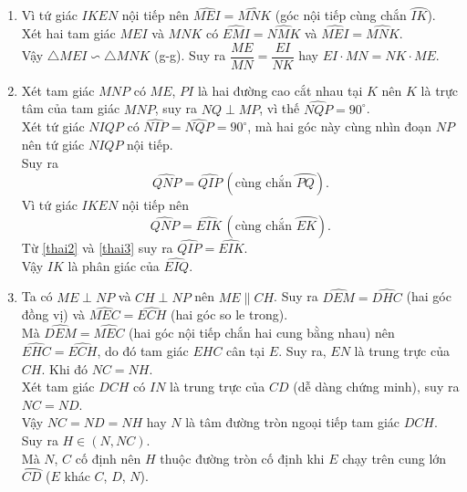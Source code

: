 \begin{ex}
{\begin{enumerate}
   Vì $E \in (O)$ nên $\widehat{NEM}=90^\circ$ (góc nội tiếp chắn nửa đường tròn). Suy ra $\widehat{NEK}=90^\circ$.\\
   Xét tứ giác $IKEN$ có $\widehat{NIK} + \widehat{NEK} = 180^\circ$, mà hai góc này ở vị trí đối diện nhau, cho nên tứ giác $IKEN$ nội tiếp.
   \item Vì tứ giác $IKEN$ nội tiếp nên $\widehat{MEI}=\widehat{MNK}$ (góc nội tiếp cùng chắn $\wideparen{IK}$).\\
   Xét hai tam giác $MEI$ và $MNK$ có $\widehat{EMI}=\widehat{NMK}$ và $\widehat{MEI}=\widehat{MNK}$.\\
   Vậy $\triangle MEI \backsim \triangle MNK$ (g-g). Suy ra $\dfrac{ME}{MN} = \dfrac{EI}{NK}$ hay $EI \cdot MN = NK \cdot ME$.
   \item Xét tam giác $MNP$ có $ME$, $PI$ là hai đường cao cắt nhau tại $K$ nên $K$ là trực tâm của tam giác $MNP$, suy ra $NQ \perp MP$, vì thế $\widehat{NQP}=90^\circ$.\\
   Xét tứ giác $NIQP$ có $\widehat{NIP}=\widehat{NQP}=90^\circ$, mà hai góc này cùng nhìn đoạn $NP$ nên tứ giác $NIQP$ nội tiếp.\\
   Suy ra
   \begin{equation}
    \widehat{QNP}=\widehat{QIP} \, (\text{cùng chắn } \wideparen{PQ}). \label{thai2}
   \end{equation}
   Vì tứ giác $IKEN$ nội tiếp nên
   \begin{equation}
    \widehat{QNP}=\widehat{EIK} \, (\text{cùng chắn } \wideparen{EK}). \label{thai3}
   \end{equation}
   Từ \eqref{thai2} và \eqref{thai3} suy ra $\widehat{QIP}=\widehat{EIK}$.\\
   Vậy $IK$ là phân giác của $\widehat{EIQ}$.
   \item Ta có $ME \perp NP$ và $CH \perp NP$ nên $ME \parallel CH$. Suy ra $\widehat{DEM}=\widehat{DHC}$ (hai góc đồng vị) và $\widehat{MEC}=\widehat{ECH}$ (hai góc so le trong).\\
   Mà $\widehat{DEM}=\widehat{MEC}$ (hai góc nội tiếp chắn hai cung bằng nhau) nên $\widehat{EHC}=\widehat{ECH}$, do đó tam giác $EHC$ cân tại $E$. Suy ra, $EN$ là trung trực của $CH$. Khi đó $NC=NH$.\\
   Xét tam giác $DCH$ có $IN$ là trung trực của $CD$ (dễ dàng chứng minh), suy ra $NC=ND$.\\
   Vậy $NC=ND=NH$ hay $N$ là tâm đường tròn ngoại tiếp tam giác $DCH$.\\
   Suy ra $H \in (N,NC)$.\\
   Mà $N$, $C$ cố định nên $H$ thuộc đường tròn cố định khi $E$ chạy trên cung lớn $\wideparen{CD}$ ($E$ khác $C$, $D$, $N$).
  \end{enumerate}
  }
\end{ex}

